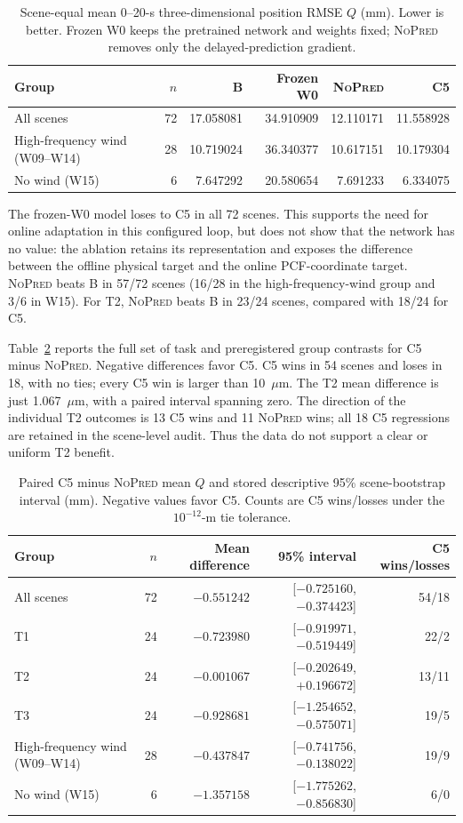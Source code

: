 \documentclass[11pt]{article}
\newcommand{\NOpred}{\textsc{NoPred}}
\begin{document}
\begin{table}[t]
\centering
\small
\caption{Scene-equal mean 0--20-s three-dimensional position RMSE $Q$ (mm). Lower is better. Frozen W0 keeps the pretrained network and weights fixed; \NOpred{} removes only the delayed-prediction gradient.}
\label{tab:means}
\begin{tabular}{lrrrrr}
\toprule
Group & $n$ & B & Frozen W0 & \NOpred{} & C5 \\
\midrule
All scenes & 72 & 17.058081 & 34.910909 & 12.110171 & 11.558928 \\
High-frequency wind (W09--W14) & 28 & 10.719024 & 36.340377 & 10.617151 & 10.179304 \\
No wind (W15) & 6 & 7.647292 & 20.580654 & 7.691233 & 6.334075 \\
\bottomrule
\end{tabular}
\end{table}

The frozen-W0 model loses to C5 in all 72 scenes. This supports the need for online adaptation in this configured loop, but does not show that the network has no value: the ablation retains its representation and exposes the difference between the offline physical target and the online PCF-coordinate target. \NOpred{} beats B in 57/72 scenes (16/28 in the high-frequency-wind group and 3/6 in W15). For T2, \NOpred{} beats B in 23/24 scenes, compared with 18/24 for C5.

Table~\ref{tab:paired} reports the full set of task and preregistered group contrasts for C5 minus \NOpred{}. Negative differences favor C5. C5 wins in 54 scenes and loses in 18, with no ties; every C5 win is larger than 10~$\mu$m. The T2 mean difference is just 1.067~$\mu$m, with a paired interval spanning zero. The direction of the individual T2 outcomes is 13 C5 wins and 11 \NOpred{} wins; all 18 C5 regressions are retained in the scene-level audit. Thus the data do not support a clear or uniform T2 benefit.

\begin{table}[t]
\centering
\small
\caption{Paired C5 minus \NOpred{} mean $Q$ and stored descriptive 95\% scene-bootstrap interval (mm). Negative values favor C5. Counts are C5 wins/losses under the $10^{-12}$-m tie tolerance.}
\label{tab:paired}
\begin{tabular}{lrrrr}
\toprule
Group & $n$ & Mean difference & 95\% interval & C5 wins/losses \\
\midrule
All scenes & 72 & $-0.551242$ & [$-0.725160$, $-0.374423$] & 54/18 \\
T1 & 24 & $-0.723980$ & [$-0.919971$, $-0.519449$] & 22/2 \\
T2 & 24 & $-0.001067$ & [$-0.202649$, $+0.196672$] & 13/11 \\
T3 & 24 & $-0.928681$ & [$-1.254652$, $-0.575071$] & 19/5 \\
High-frequency wind (W09--W14) & 28 & $-0.437847$ & [$-0.741756$, $-0.138022$] & 19/9 \\
No wind (W15) & 6 & $-1.357158$ & [$-1.775262$, $-0.856830$] & 6/0 \\
\bottomrule
\end{tabular}
\end{table}
\end{document}
